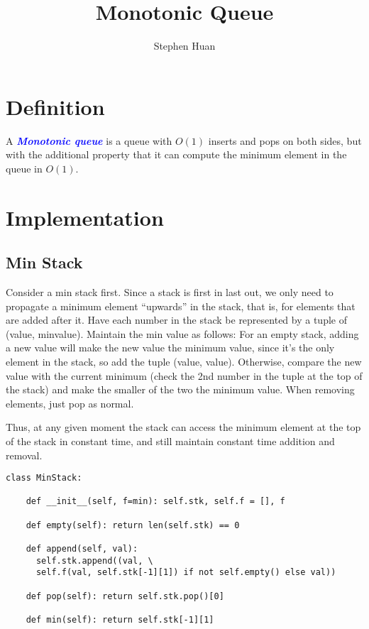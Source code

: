 \documentclass[11pt, oneside]{article}
\title{Monotonic Queue}
\author{Stephen Huan}
\newcommand{\emphasis}[1]{\textcolor{blue}{\textbf{\textit{#1}}}}
\begin{document}
\maketitle

\section{Definition}

A \emphasis{Monotonic queue} is a queue with \( O(1) \) inserts and pops on both sides, but with the additional property
that it can compute the minimum element in the queue in \( O(1) \).

\section{Implementation}
\subsection{Min Stack}

Consider a min stack first. Since a stack is first in last out, we only need to propagate a minimum element
``upwards'' in the stack, that is, for elements that are added after it.
Have each number in the stack be represented by a tuple of (value, minvalue). Maintain the min value as follows:
For an empty stack, adding a new value will make the new value the minimum value, since it's the only element in the stack, so add the tuple (value, value).
Otherwise, compare the new value with the current minimum (check the 2nd number in the tuple at the top of the stack) and
make the smaller of the two the minimum value. When removing elements, just pop as normal.

Thus, at any given moment the stack can access the minimum element at the top of the stack in constant time,
and still maintain constant time addition and removal.

\begin{verbatim}
class MinStack:

    def __init__(self, f=min): self.stk, self.f = [], f

    def empty(self): return len(self.stk) == 0

    def append(self, val):
      self.stk.append((val, \
      self.f(val, self.stk[-1][1]) if not self.empty() else val))

    def pop(self): return self.stk.pop()[0]

    def min(self): return self.stk[-1][1]
\end{verbatim}
\end{document}
